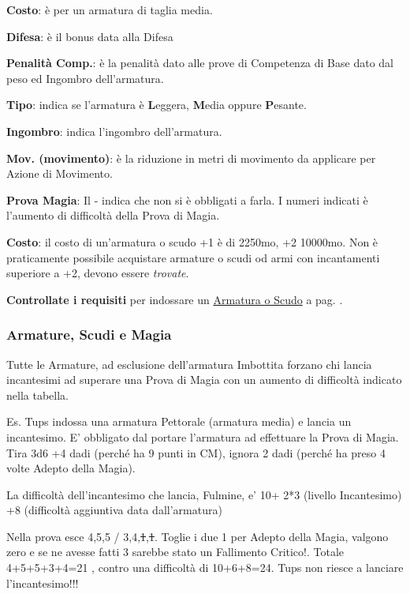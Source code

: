 \begin{multicols}{2}

\medskip

\textbf{Costo}: è per un armatura di taglia media.

\textbf{Difesa}: è il bonus data alla Difesa

\textbf{Penalità Comp.}: è la penalità dato alle prove di Competenza di Base dato dal peso ed Ingombro dell'armatura.

\textbf{Tipo}: indica se l'armatura è \textbf{L}eggera, \textbf{M}edia oppure \textbf{P}esante.

\textbf{Ingombro}: indica l'ingombro dell'armatura.

\textbf{Mov. (movimento)}: è la riduzione in metri di movimento da applicare per Azione di Movimento.

\textbf{Prova Magia}: Il - indica che non si è obbligati a farla. I numeri indicati è l'aumento di difficoltà della Prova di Magia.

\textbf{Costo}: il costo di un'armatura o scudo +1 è di 2250mo, +2 10000mo. Non è praticamente possibile acquistare armature o scudi od armi con incantamenti superiore a +2, devono essere \emph{trovate}.

\textbf{Controllate i requisiti} per indossare un \hyperlink{indossarearmature}{Armatura o Scudo} a pag. \pageref{indossarearmature}.


\subsubsection{Armature, Scudi e Magia}\hypertarget{armatureemagie}{}\label{armatureemagie}

Tutte le Armature, ad esclusione dell'armatura Imbottita forzano chi lancia incantesimi ad superare una Prova di Magia con un aumento di difficoltà indicato nella tabella.

Es. Tups indossa una armatura Pettorale (armatura media) e lancia un incantesimo. E' obbligato dal portare l'armatura ad effettuare la Prova di Magia. Tira 3d6 +4 dadi (perché ha 9 punti in CM), ignora 2 dadi (perché ha preso 4 volte Adepto della Magia).

La difficoltà dell'incantesimo che lancia, Fulmine, e' 10+ 2*3 (livello Incantesimo) +8 (difficoltà aggiuntiva data dall'armatura)

Nella prova esce 4,5,5 / 3,4,\st{1},\st{1}. Toglie i due 1 per Adepto della Magia, valgono zero e se ne avesse fatti 3 sarebbe stato un Fallimento Critico!. Totale 4+5+5+3+4=21 , contro una difficoltà di 10+6+8=24. Tups non riesce a lanciare l'incantesimo!!!


\end{multicols}
